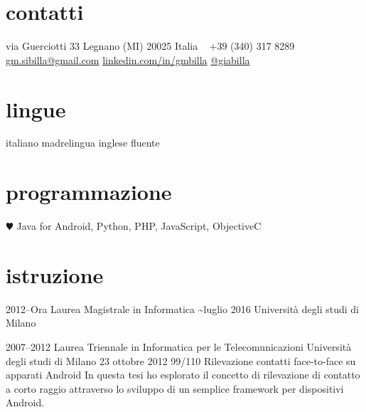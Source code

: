 \documentclass[print]{friggeri-custom} %
\begin{document}


\begin{aside} %
\section{contatti}
via Guerciotti 33
Legnano (MI) 20025
Italia
~
+39 (340) 317 8289
~
\href{mailto:gm.sibilla@gmail.com}{gm.sibilla@gmail.com}
\href{https://linkedin.com/in/gmbilla}{linkedin.com/in/gmbilla}
\href{https://twitter.com/giabilla}{@giabilla}
\section{lingue}
italiano madrelingua
inglese fluente
\section{programmazione}
{\color{red} $\varheartsuit$} Java for Android, Python, PHP, JavaScript, ObjectiveC
\end{aside}


\section{istruzione}

\begin{entrylist}


\entry
{2012--Ora}
{Laurea Magistrale {\normalfont in Informatica}}
{\textasciitilde luglio 2016}
{Università degli studi di Milano}


\eduentry
{2007--2012}
{Laurea Triennale {\normalfont in Informatica per le Telecomunicazioni}}
{Università degli studi di Milano}
{23 ottobre 2012}
{99/110}
{Rilevazione contatti face-to-face su apparati Android}
{In questa tesi ho esplorato il concetto di rilevazione di contatto a corto raggio attraverso lo sviluppo di un semplice framework per dispositivi Android.}


\end{entrylist}
\end{document}
